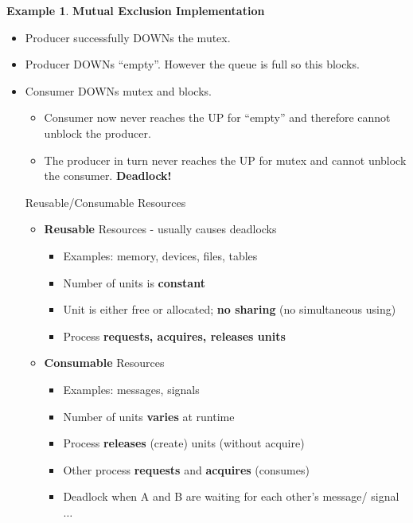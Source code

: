 \documentclass[11pt,a4paper]{article}
\theoremstyle{definition}
\newtheorem{example}{Example}[section]
\newenvironment{myitemize}
{ \begin{itemize}
    \setlength{\itemsep}{5pt}
    \setlength{\parskip}{0pt}
    \setlength{\parsep}{0pt}     }
{ \end{itemize}                  }
\begin{document}
\begin{example}{\textbf{Mutual Exclusion Implementation}}
\begin{myitemize}
\begin{myitemize}
\begin{tcolorbox}
				\centering
			\end{tcolorbox}
			\item Producer successfully DOWNs the mutex.
			\item Producer DOWNs “empty”. However the queue is full so this blocks.
			\item Consumer DOWNs mutex and blocks.
			\begin{myitemize}
				\item Consumer now never reaches the UP for “empty” and therefore cannot unblock the producer.
				\item The producer in turn never reaches the UP for mutex and cannot unblock the consumer. \textbf{Deadlock!}
			\end{myitemize}
			\begin{tcolorbox}
				\textsf{Reusable/Consumable Resources}
				\begin{myitemize}
					\item \textbf{Reusable} Resources - usually causes deadlocks
					\begin{myitemize}
						\item Examples: memory, devices, files, tables 
						\item Number of units is \textbf{constant}
						\item Unit is either free or allocated; \textbf{no sharing} (no simultaneous using) 
						\item Process \textbf{requests, acquires, releases units}
					\end{myitemize}
					\item \textbf{Consumable} Resources
					\begin{myitemize}
						\item Examples: messages, signals
						\item Number of units \textbf{varies} at runtime 
						\item Process \textbf{releases} (create) units (without acquire) 
						\item Other process \textbf{requests} and \textbf{acquires} (consumes)
						\item Deadlock when A and B are waiting for each other's message/ signal $\dots$
					\end{myitemize}
				\end{myitemize}
			\end{tcolorbox}
		\end{myitemize}
	\end{myitemize}
\end{example}
\end{document}
